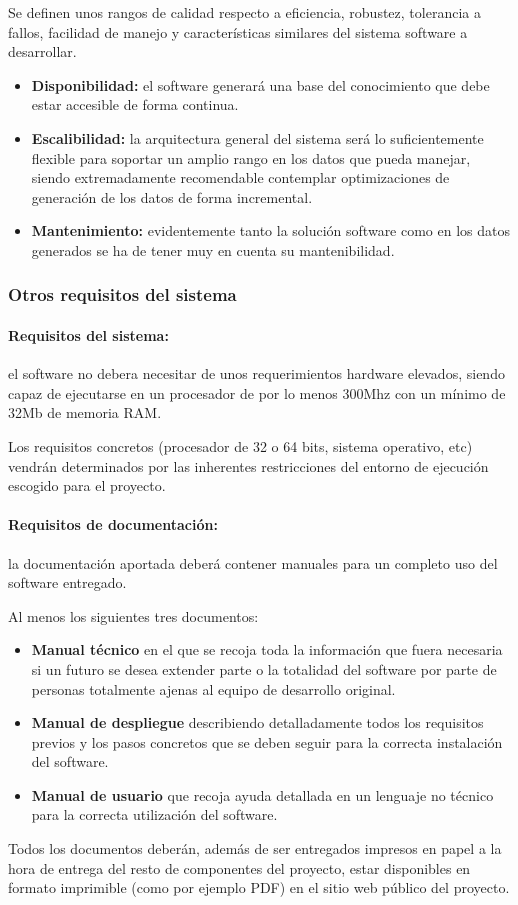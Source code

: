 Se definen unos rangos de calidad respecto a eficiencia, robustez, 
tolerancia a fallos, facilidad de manejo y características similares 
del sistema software a desarrollar.

\begin{itemize}
  \item \textbf{Disponibilidad:} el software generará una base del 
	conocimiento que debe estar accesible de forma continua.
  \item \textbf{Escalibilidad:} la arquitectura general del sistema 
	será lo suficientemente flexible para soportar un amplio
	rango en los datos que pueda manejar, siendo extremadamente
	recomendable contemplar optimizaciones de generación de los 
	datos de forma incremental.
  \item \textbf{Mantenimiento:} evidentemente tanto la solución software 
	como en los datos generados se ha de tener muy en cuenta su
	mantenibilidad.
\end{itemize}

\subsubsection{Otros requisitos del sistema}

\paragraph{Requisitos del sistema:} el software no debera necesitar de
unos requerimientos hardware elevados, siendo capaz de ejecutarse en
un procesador de por lo menos 300Mhz con un mínimo de 32Mb de memoria 
RAM. 

Los requisitos concretos (procesador de 32 o 64 bits, sistema operativo, 
etc) vendrán determinados por las inherentes restricciones del entorno de 
ejecución escogido para el proyecto.

\paragraph{Requisitos de documentación:} la documentación aportada deberá
contener manuales para un completo uso del software entregado.

Al menos los siguientes tres documentos:

\begin{itemize}
  \item \textbf{Manual técnico} en el que se recoja toda la información que 
	fuera necesaria si un futuro se desea extender parte o la totalidad 
	del software por parte de personas totalmente ajenas al equipo de 
	desarrollo original.
  \item \textbf{Manual de despliegue} describiendo detalladamente todos los 
	requisitos previos y los pasos concretos que se deben seguir para la 
	correcta instalación del software.
  \item \textbf{Manual de usuario} que recoja ayuda detallada en un lenguaje
	no técnico para la correcta utilización del software.
\end{itemize}

Todos los documentos deberán, además de ser entregados impresos en papel a la
hora de entrega del resto de componentes del proyecto, estar disponibles en
formato imprimible (como por ejemplo PDF) en el sitio web público del proyecto.


